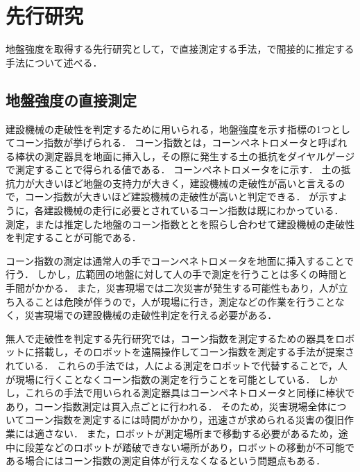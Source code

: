 \documentclass[../main]{subfiles}
\begin{document}
\graphicspath{{../figures/chap1/}}

\section{先行研究}
\label{sec:intro_previous-research}
地盤強度を取得する先行研究として，で直接測定する手法，で間接的に推定する手法について述べる．
\subsection{地盤強度の直接測定}
\label{subsec:intro_presearch_direct}
建設機械の走破性を判定するために用いられる，地盤強度を示す指標の1つとしてコーン指数が挙げられる．
コーン指数とは，コーンペネトロメータと呼ばれる棒状の測定器具を地面に挿入し，その際に発生する土の抵抗をダイヤルゲージで測定することで得られる値である．
コーンペネトロメータをに示す．
土の抵抗力が大きいほど地盤の支持力が大きく，建設機械の走破性が高いと言えるので，コーン指数が大きいほど建設機械の走破性が高いと判定できる．
が示すように，各建設機械の走行に必要とされているコーン指数は既にわかっている．
測定，または推定した地盤のコーン指数ととを照らし合わせて建設機械の走破性を判定することが可能である．

コーン指数の測定は通常人の手でコーンペネトロメータを地面に挿入することで行う．
しかし，広範囲の地盤に対して人の手で測定を行うことは多くの時間と手間がかかる．
また，災害現場では二次災害が発生する可能性もあり，人が立ち入ることは危険が伴うので，人が現場に行き，測定などの作業を行うことなく，災害現場での建設機械の走破性判定を行える必要がある．

無人で走破性を判定する先行研究では，コーン指数を測定するための器具をロボットに搭載し，そのロボットを遠隔操作してコーン指数を測定する手法が提案されている．
これらの手法では，人による測定をロボットで代替することで，人が現場に行くことなくコーン指数の測定を行うことを可能としている．
しかし，これらの手法で用いられる測定器具はコーンペネトロメータと同様に棒状であり，コーン指数測定は貫入点ごとに行われる．
そのため，災害現場全体についてコーン指数を測定するには時間がかかり，迅速さが求められる災害の復旧作業には適さない．
また，ロボットが測定場所まで移動する必要があるため，途中に段差などのロボットが踏破できない場所があり，ロボットの移動が不可能である場合にはコーン指数の測定自体が行えなくなるという問題点もある．
\end{document}
